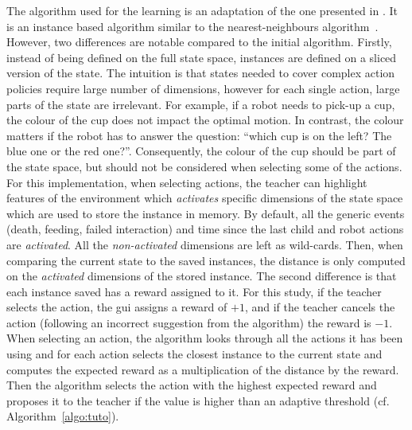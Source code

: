 The algorithm used for the learning is an adaptation of the one presented in \cite{senft2017toward}. It is an instance based algorithm similar to the nearest-neighbours algorithm~\citep{cover1967nearest}. However, two differences are notable compared to the initial algorithm. %
Firstly, instead of being defined on the full state space, instances are defined on a sliced version of the state. The intuition is that states needed to cover complex action policies require large number of dimensions, however for each single action, large parts of the state are irrelevant. For example, if a robot needs to pick-up a cup, the colour of the cup does not impact the optimal motion. In contrast, the colour matters if the robot has to answer the question: ``which cup is on the left? The blue one or the red one?''. Consequently, the colour of the cup should be part of the state space, but should not be considered when selecting some of the actions. For this implementation, when selecting actions, the teacher can highlight features of the environment which \emph{activates} specific dimensions of the state space which are used to store the instance in memory. By default, all the generic events (death, feeding, failed interaction) and time since the last child and robot actions are \emph{activated}. All the \emph{non-activated} dimensions are left as wild-cards. Then, when comparing the current state to the saved instances, the distance is only computed on the \emph{activated} dimensions of the stored instance. The second difference is that each instance saved has a reward assigned to it. For this study, if the teacher selects the action, the \gls{gui} assigns a reward of $+1$, and if the teacher cancels the action (following an incorrect suggestion from the algorithm) the reward is $-1$. When selecting an action, the algorithm looks through all the actions it has been using and for each action selects the closest instance to the current state and computes the expected reward as a multiplication of the distance by the reward. Then the algorithm selects the action with the highest expected reward and proposes it to the teacher if the value is higher than an adaptive threshold (cf. Algorithm~\ref{algo:tuto}). 


